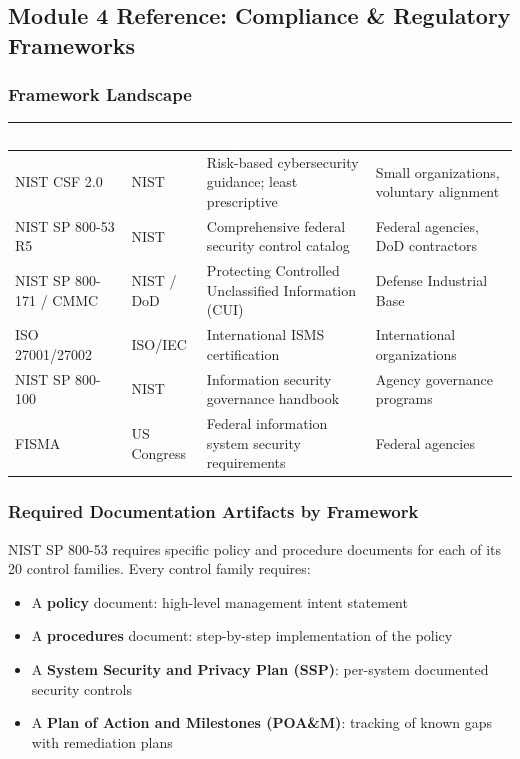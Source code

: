 \documentclass[11pt,letterpaper]{article}
\newcommand{\tableheader}[1]{\textbf{\sffamily\textcolor{white}{#1}}}
\begin{document}
\subsection{Module 4 Reference: Compliance \& Regulatory Frameworks}

\subsubsection{Framework Landscape}

\begin{center}
\begin{tabularx}{\textwidth}{L{3cm}L{3cm}XL{2.5cm}}
\toprule
{}
\tableheader{Framework} & \tableheader{Owner} & \tableheader{Scope} & \tableheader{Best For} \\
\midrule
NIST CSF 2.0 & NIST & Risk-based cybersecurity guidance; least prescriptive & Small organizations, voluntary alignment \\
NIST SP 800-53 R5 & NIST & Comprehensive federal security control catalog & Federal agencies, DoD contractors \\
NIST SP 800-171 / CMMC & NIST / DoD & Protecting Controlled Unclassified Information (CUI) & Defense Industrial Base \\
ISO 27001/27002 & ISO/IEC & International ISMS certification & International organizations \\
NIST SP 800-100 & NIST & Information security governance handbook & Agency governance programs \\
FISMA & US Congress & Federal information system security requirements & Federal agencies \\
\bottomrule
\end{tabularx}
\end{center}

\subsubsection{Required Documentation Artifacts by Framework}

NIST SP 800-53 requires specific policy and procedure documents for each of its 20 control families. Every control family requires:
\begin{itemize}[leftmargin=*]
  \item A \textbf{policy} document: high-level management intent statement
  \item A \textbf{procedures} document: step-by-step implementation of the policy
  \item A \textbf{System Security and Privacy Plan (SSP)}: per-system documented security controls
  \item A \textbf{Plan of Action and Milestones (POA\&M)}: tracking of known gaps with remediation plans
\end{itemize}
\end{document}
